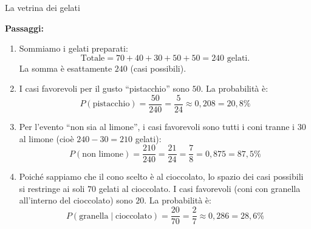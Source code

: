 \begin{esercizio}{La vetrina dei gelati}
\begin{soluzione}
  \textbf{Passaggi:}
  \begin{enumerate}[label=\alph*)]
    \item Sommiamo i gelati preparati:
    \[
    \text{Totale} = 70 + 40 + 30 + 50 + 50 = 240 \text{ gelati}.
    \]
    La somma è esattamente $240$ (casi possibili).
    \item I casi favorevoli per il gusto ``pistacchio'' sono $50$. La probabilità è:
    \[
    P(\text{pistacchio}) = \frac{50}{240} = \frac{5}{24} \approx 0{,}208 = 20{,}8\%
    \]
    \item Per l'evento ``non sia al limone'', i casi favorevoli sono tutti i coni tranne i $30$ al limone (cioè $240 - 30 = 210$ gelati):
    \[
    P(\text{non limone}) = \frac{210}{240} = \frac{21}{24} = \frac{7}{8} = 0{,}875 = 87{,}5\%
    \]
    \item Poiché sappiamo che il cono scelto è al cioccolato, lo spazio dei casi possibili si restringe ai soli $70$ gelati al cioccolato.
    I casi favorevoli (coni con granella all'interno del cioccolato) sono $20$. La probabilità è:
    \[
    P(\text{granella} \mid \text{cioccolato}) = \frac{20}{70} = \frac{2}{7} \approx 0{,}286 = 28{,}6\%
    \]
  \end{enumerate}
\end{soluzione}
\end{esercizio}

\condnewpage

